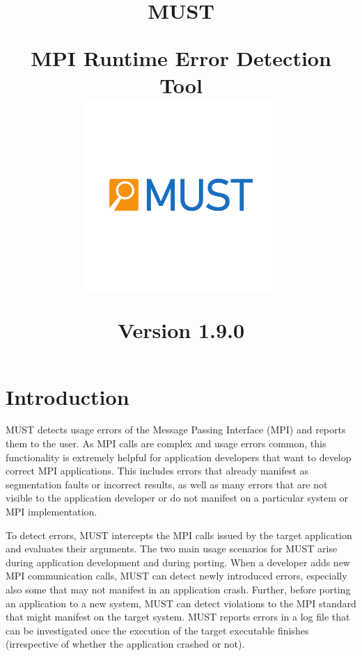 \documentclass[english]{scrartcl}
\def \MUSTVersion {1.9.0}
\begin{document}
\title{\textsf{\textcolor{blue}{\Huge}}\\
\begin{center}
MUST
\end{center}
\textsf{\large MPI Runtime Error Detection Tool}\\
\vspace{8ex}
\centering\includegraphics[width=0.55\textwidth]{logo.pdf}
\begin{center}
\textsf{\normalfont \normalsize Version \MUSTVersion}\\
\end{center}
}
\maketitle

\newpage{}

\tableofcontents{}

\newpage{}

\section{Introduction}

MUST detects usage errors of the Message Passing Interface (MPI) and reports
them to the user.
As MPI calls are complex and usage errors common, this functionality is
extremely helpful for application developers that want to develop correct MPI applications.
This includes errors that already manifest as segmentation faults or incorrect
results, as well as many errors that are not visible to the application
developer or do not manifest on a particular system or MPI implementation. 

To detect errors, MUST intercepts the MPI calls issued by the target
application and evaluates their arguments. The two main usage
scenarios for MUST arise during application development and during porting.
When a developer adds new MPI communication calls, MUST can detect
newly introduced errors, especially also some that may not manifest in an
application crash. Further,
before porting an application to a new system, MUST can detect violations to the
MPI standard that might manifest on the target system. MUST reports errors
in a log file that can be investigated once the execution of the target
executable finishes (irrespective of whether the application crashed or not).
\end{document}
